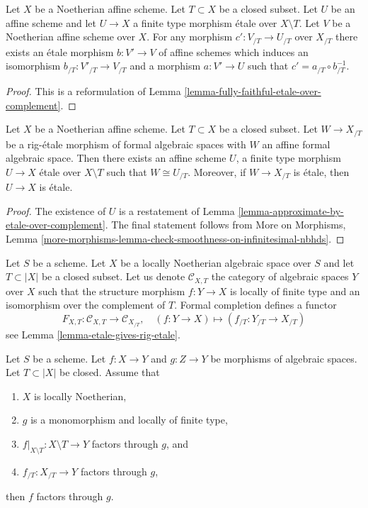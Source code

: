 \begin{lemma}
\label{lemma-algebraize-morphism-rig-etale}
Let $X$ be a Noetherian affine scheme. Let $T \subset X$ be a closed subset.
Let $U$ be an affine scheme and let $U \to X$ a finite type morphism
\'etale over $X \setminus T$. Let $V$ be a Noetherian affine scheme over $X$.
For any morphism $c' : V_{/T} \to U_{/T}$ over $X_{/T}$ there exists
an \'etale morphism $b : V' \to V$ of affine schemes which induces an
isomorphism $b_{/T} : V'_{/T} \to V_{/T}$ and a morphism $a : V' \to U$
such that $c' = a_{/T} \circ b_{/T}^{-1}$.
\end{lemma}

\begin{proof}
This is a reformulation of
Lemma \ref{lemma-fully-faithful-etale-over-complement}.
\end{proof}

\begin{lemma}
\label{lemma-algebraize-rig-etale-affine}
Let $X$ be a Noetherian affine scheme. Let $T \subset X$ be a closed subset.
Let $W \to X_{/T}$ be a rig-\'etale morphism of formal algebraic
spaces with $W$ an affine formal algebraic space. Then there exists
an affine scheme $U$, a finite type morphism $U \to X$ \'etale over
$X \setminus T$ such that $W \cong U_{/T}$.
Moreover, if $W \to X_{/T}$ is \'etale, then $U \to X$ is \'etale.
\end{lemma}

\begin{proof}
The existence of $U$ is a restatement of
Lemma \ref{lemma-approximate-by-etale-over-complement}.
The final statement follows from
More on Morphisms, Lemma
\ref{more-morphisms-lemma-check-smoothness-on-infinitesimal-nbhds}.
\end{proof}

\noindent
Let $S$ be a scheme. Let $X$ be a locally Noetherian algebraic space over $S$
and let $T \subset |X|$ be a closed subset. Let us denote
$\mathcal{C}_{X, T}$ the category of algebraic spaces $Y$ over $X$
such that the structure morphism $f : Y \to X$
is locally of finite type and an isomorphism over the complement of
$T$. Formal completion defines a functor
\begin{equation}
\label{equation-completion-functor}
F_{X, T} : \mathcal{C}_{X, T} \longrightarrow \mathcal{C}_{X_{/T}},\quad
(f : Y \to X) \longmapsto (f_{/T} : Y_{/T} \to X_{/T})
\end{equation}
see Lemma \ref{lemma-etale-gives-rig-etale}.

\begin{lemma}
\label{lemma-factor}
Let $S$ be a scheme. Let $f : X \to Y$ and $g : Z \to Y$ be morphisms
of algebraic spaces. Let $T \subset |X|$ be closed.
Assume that
\begin{enumerate}
\item $X$ is locally Noetherian,
\item $g$ is a monomorphism and locally of finite type,
\item $f|_{X \setminus T} : X \setminus T \to Y$ factors through $g$, and
\item $f_{/T} : X_{/T} \to Y$ factors through $g$,
\end{enumerate}
then $f$ factors through $g$.
\end{lemma}

